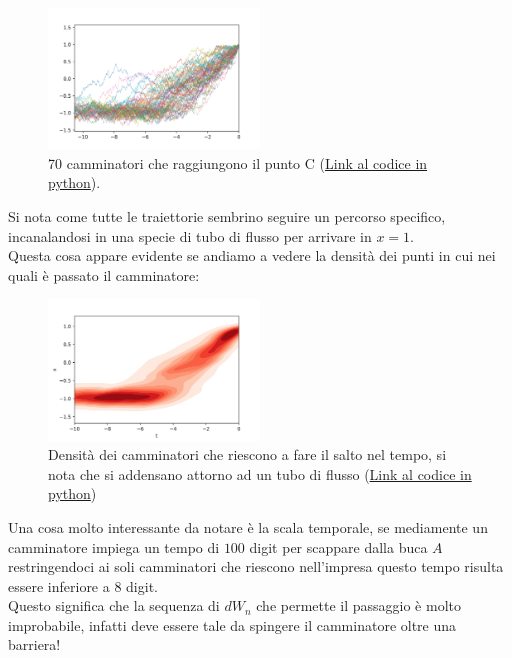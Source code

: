 \begin{figure}[H]
    \centering
    \includegraphics[width=0.5\textwidth]{figures/lez_12_walker_t_path.png}
    \caption{\scriptsize 70 camminatori che raggiungono il punto C (\href{https://github.com/dodogabrie/Sistemi-Complessi/blob/master/python-project/lezione12/MFPT_simulation_py.ipynb}{Link al codice in python}).}
    \label{fig:figures-lez_12_walker_t_path-png}
\end{figure}
\noindent 
Si nota come tutte le traiettorie sembrino seguire un percorso specifico, incanalandosi in una specie di tubo di flusso per arrivare in $x=1$. \\
Questa cosa appare evidente se andiamo a vedere la densità dei punti in cui nei quali è passato il camminatore:
\begin{figure}[H]
    \centering
    \includegraphics[width=0.5\textwidth]{figures/lez_12_walker_t.png}
    \caption{\scriptsize Densità dei camminatori che riescono a fare il salto nel tempo, si nota che si addensano attorno ad un tubo di flusso (\href{https://github.com/dodogabrie/Sistemi-Complessi/blob/master/python-project/lezione12/MFPT_simulation_py.ipynb}{Link al codice in python})}
    \label{fig:figures-lez_12_walker_t-png-}
\end{figure}
\noindent 
Una cosa molto interessante da notare è la scala temporale, se mediamente un camminatore impiega un tempo di $100$ digit per scappare dalla buca $A$ restringendoci ai soli camminatori che riescono nell'impresa questo tempo risulta essere inferiore a $8$ digit. \\
Questo significa che la sequenza di $dW_n$ che permette il passaggio è molto improbabile, infatti deve essere tale da spingere il camminatore oltre una barriera!\\
